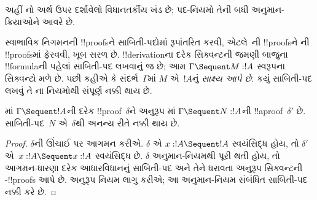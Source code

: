 \documentclass[../../../include/open-logic-section]{subfiles}
\begin{document}


અહીં નો અર્થ ઉપર દર્શાવેલો વિધાનતર્કીય
ખંડ છે; પદ-નિયમો તેની બધી અનુમાન-ક્રિયાઓને આવરે છે.

સ્વાભાવિક નિગમનની !!{proof}sને સાબિતી-પદોમાં
રૂપાંતરિત કરવી, એટલે~ની !!{proof}sને
ની !!{proof}sમાં ફેરવવી, ખૂબ
સરળ છે. !!{derivation}ના દરેક સિક્વન્ટની
જમણી બાજુના !!{formula}ની પહેલાં
સાબિતી-પદ લખવાનું જ છે; આમ
$\Gamma \Sequent M : !A$ સ્વરૂપના
સિક્વન્ટો મળે છે. પછી કહીએ કે
સંદર્ભ~$\Gamma$માં $M$ એ~$!A$નું
\emph{સાક્ષ્ય આપે છે}. કયું સાબિતી-પદ
લખવું તે ના નિયમોથી
સંપૂર્ણ નક્કી થાય છે.

\begin{prop}
માં $\Gamma \Sequent !A$ની
દરેક !!{proof}~$\delta$ને અનુરૂપ
માં $\Gamma \Sequent N : !A$ની
!!a{proof}~$\delta'$ છે. સાબિતી-પદ~$N$
એ~$\delta$થી અનન્ય રીતે નક્કી થાય છે.
\end{prop}

\begin{proof}
$\delta$ની ઊંચાઈ પર આગમન કરીએ.
$\delta$ એ $x:!A \Sequent !A$ સ્વયંસિદ્ધ હોય,
તો $\delta'$ એ~$x:!A \Sequent x:!A$
સ્વયંસિદ્ધ છે. $\delta$ અનુમાન-નિયમથી
પૂરી થતી હોય, તો આગમન-ધારણા દરેક
આધારવિધાનનું સાબિતી-પદ અને તેને ધરાવતા
અનુરૂપ સિક્વન્ટની -!!{proof}s
આપે છે. અનુરૂપ  નિયમ
લાગુ કરીએ; આ  અનુમાન-નિયમ સંબંધિત
સાબિતી-પદ નક્કી કરે છે.
\end{proof}
\end{document}

